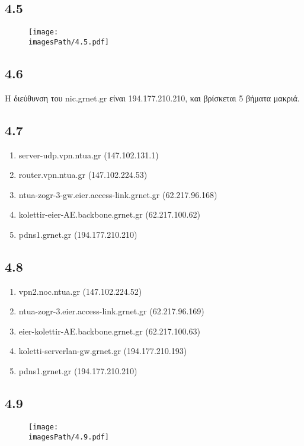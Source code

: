 		\subsection*{4.5}
			\begin{figure}[H]
				\texttt{[image: \\imagesPath/4.5.pdf]}
			\end{figure}		

		\subsection*{4.6}
			Η διεύθυνση του nic.grnet.gr είναι 194.177.210.210, και βρίσκεται 5 βήματα μακριά.

		\subsection*{4.7}
			\begin{enumerate}
				\item server-udp.vpn.ntua.gr (147.102.131.1) 
				\item router.vpn.ntua.gr (147.102.224.53)  
				\item ntua-zogr-3-gw.eier.access-link.grnet.gr (62.217.96.168)
				\item kolettir-eier-AE.backbone.grnet.gr (62.217.100.62)
				\item pdns1.grnet.gr (194.177.210.210) 
			\end{enumerate}
			

		\subsection*{4.8}
			\begin{enumerate}
				\item vpn2.noc.ntua.gr (147.102.224.52)
				\item ntua-zogr-3.eier.access-link.grnet.gr (62.217.96.169)
				\item eier-kolettir-AE.backbone.grnet.gr (62.217.100.63)
				\item koletti-serverlan-gw.grnet.gr (194.177.210.193)
				\item pdns1.grnet.gr (194.177.210.210)
			\end{enumerate}

		\subsection*{4.9}
			\begin{figure}[H]
				\texttt{[image: \\imagesPath/4.9.pdf]}
			\end{figure}
